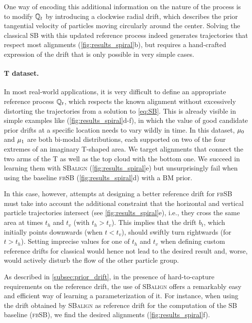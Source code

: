 One way of encoding this additional information on the nature of the process is to modify $\mathbb{Q}_{ t }$ by introducing a clockwise radial drift, which describes the prior tangential velocity of particles moving circularly around the center.
Solving the classical \acrshort{SB} with this updated reference process indeed generates trajectories that respect most alignments (\cref{fig:results_spiral}b), but requires a hand-crafted expression of the drift that is only possible in very simple cases.

\paragraph{T dataset.}
In most real-world applications, it is very difficult to define an appropriate reference process $\mathbb{Q}_{ t }$, which respects the known alignment without excessively distorting the trajectories from a solution to \eqref{eq:SB}. This is already visible in simple examples like (\cref{fig:results_spiral}d-f), in which the value of good candidate prior drifts at a specific location needs to vary wildly in time.
In this dataset, $\mu_0$ and $\mu_1$ are both bi-modal distributions, each supported on two of the four extremes of an imaginary T-shaped area.
We target alignments that connect the two arms of the T as well as the top cloud with the bottom one. We succeed in learning them with \textsc{SBalign} (\cref{fig:results_spiral}e) but unsurprisingly fail when using the baseline \textsc{fbSB} (\cref{fig:results_spiral}d) with a \acrshort{BM} prior.

 In this case, however, attempts at designing a better reference drift for \textsc{fbSB} must take into account the additional constraint that the horizontal and vertical particle trajectories intersect (see \cref{fig:results_spiral}e), i.e., they cross the same area at times $t_h$ and $t_v$ (with $t_h > t_v$). This implies that the drift $b_t$, which initially points downwards (when $t < t_v$), should swiftly turn rightwards (for $t > t_h$).
Setting imprecise values for one of $t_h$ and $t_v$ when defining custom reference drifts for classical  would hence not lead to the desired result and, worse, would actively disturb the flow of the other particle group.

 As described in \cref{subsec:prior_drift}, in the presence of hard-to-capture requirements on the reference drift, the use of \textsc{SBalign} offers a remarkably easy and efficient way of learning a parameterization of it. For instance, when using the drift obtained by \textsc{SBalign} as reference drift for the computation of the \acrshort{SB} baseline (\textsc{fbSB}), we find the desired alignments (\cref{fig:results_spiral}f).

